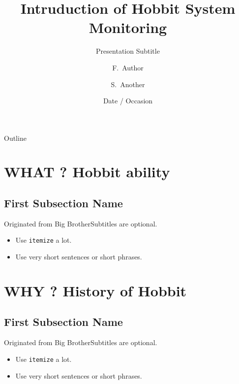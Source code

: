 \documentclass{beamer}
\title[Short Paper Title] %
{Intruduction of Hobbit System Monitoring}
\subtitle
{Presentation Subtitle} %
\author[Author, Tyng-Jing Yang] %
{F.~Author\inst{1} \and S.~Another\inst{2}}
\institute[Hobbitmon ] %
{
  \inst{1}%
  Hobbitmon Community
}
\date[Short Occasion] %
{Date / Occasion}
\begin{document}
\begin{frame}
  \titlepage
\end{frame}

\begin{frame}{Outline}
  \tableofcontents
\end{frame}




\section{WHAT ? Hobbit ability}

\subsection[Short First Subsection Name]{First Subsection Name}

\begin{frame}{Originated from Big Brother}{Subtitles are optional.}
  \begin{itemize}
  \item
    Use \texttt{itemize} a lot.
  \item
    Use very short sentences or short phrases.
  \end{itemize}
\end{frame}


\section{WHY ? History of Hobbit}

\subsection[Short First Subsection Name]{First Subsection Name}

\begin{frame}{Originated from Big Brother}{Subtitles are optional.}
  \begin{itemize}
  \item
    Use \texttt{itemize} a lot.
  \item
    Use very short sentences or short phrases.
  \end{itemize}
\end{frame}
\end{document}
